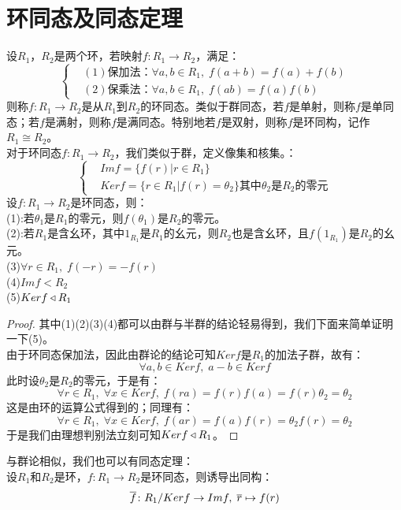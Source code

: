 \section{环同态及同态定理}
设$R_1$，$R_2$是两个环，若映射$f\colon R_1\to R_2$，满足：
\[
\left\{
\begin{aligned}
&(1)\text{保加法：}\forall a,b\in R_1,\; f(a+b)=f(a)+f(b)\\
&(2)\text{保乘法：}\forall a,b\in R_1,\; f(ab)=f(a)f(b)
\end{aligned}\right.
\]
则称$f\colon R_1\to R_2$是从$R_1$到$R_2$的环同态。类似于群同态，若$f$是单射，则称$f$是单同态；若$f$是满射，则称$f$是满同态。特别地若$f$是双射，则称$f$是环同构，记作$R_1\cong R_2$。\\
对于环同态$f\colon R_1\to R_2$，我们类似于群，定义像集和核集。：
\[
\left\{
\begin{aligned}
&Imf=\{f(r)|r\in R_1\}\\
&Kerf=\{r\in R_1|f(r)=\theta_2\}\text{其中}\theta_2\text{是}R_2\text{的零元}
\end{aligned}\right.
\]
设$f\colon R_1\to R_2$是环同态，则：\\
\indent (1):若$\theta_1$是$R_1$的零元，则$f(\theta_1)$是$R_2$的零元。\\
\indent (2):若$R_1$是含幺环，其中$1_{R_1}$是$R_1$的幺元，则$R_2$也是含幺环，且$f(1_{R_1})$是$R_2$的幺元。\\
\indent (3)$\forall r\in R_1,\; f(-r)=-f(r)$\\
\indent (4)$Imf<R_2$\\
\indent (5)$Kerf\triangleleft R_1$\\
\begin{proof}
其中(1)(2)(3)(4)都可以由群与半群的结论轻易得到，我们下面来简单证明一下(5)。\\
\indent 由于环同态保加法，因此由群论的结论可知$Kerf$是$R_1$的加法子群，故有：
\[
\forall a,b\in Kerf,\; a-b\in Kerf
\]
此时设$\theta_2$是$R_2$的零元，于是有：
\[
\forall r\in R_1,\; \forall x\in Kerf,\; f(ra)=f(r)f(a)=f(r)\theta_2=\theta_2
\]
这是由环的运算公式得到的；同理有：
\[
\forall r\in R_1,\; \forall x\in Kerf,\; f(ar)=f(a)f(r)=\theta_2f(r)=\theta_2
\]
于是我们由理想判别法立刻可知$Kerf\triangleleft R_1$。
\end{proof}
与群论相似，我们也可以有同态定理：\\
设$R_1$和$R_2$是环，$f\colon R_1\to R_2$是环同态，则诱导出同构：
\[
\overline{f}\colon R_1/Kerf\to Imf,\; \overline{r}\mapsto f(r)
\]
